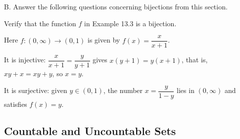 \documentclass[DIN, pagenumber=false, fontsize=11pt, parskip=half]{scrartcl}
\begin{document}
\begin{exercise}{B.}
    Answer the following questions concerning bijections from this section.
\end{exercise}

\begin{problems}[from=16]
    \problem Verify that the function $f$ in Example 13.3 is a bijection.

    \answer Here $f : (0,\infty) \to (0,1)$ is given by $f(x) = \dfrac{x}{x+1}$.

    It is injective: $\dfrac{x}{x+1} = \dfrac{y}{y+1}$ gives $x(y+1) = y(x+1)$, that is, $xy + x = xy + y$, so $x = y$.

    It is surjective: given $y \in (0,1)$, the number $x = \dfrac{y}{1-y}$ lies in $(0,\infty)$ and satisfies $f(x) = y$.
\end{problems}

\subsection{Countable and Uncountable Sets}
\end{document}
